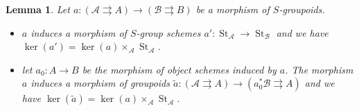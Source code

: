 \documentclass{amsart}
\newtheorem{lemm}{Lemma}[section]
\theoremstyle{definition}
\theoremstyle{remark}
\begin{document}
\begin{lemm}

\label{lemm}
Let $ a : ({{\mathcal A}} {\rightrightarrows} A) {\longrightarrow} ({{\mathcal B}} {\rightrightarrows} B)$ be a morphism of $S$-groupoids.
\begin{itemize}
\item[(i)] $a$ induces a morphism of $S$-group schemes $a' : \operatorname{St}_{{\mathcal A}} {\longrightarrow} \operatorname{St}_{{\mathcal B}}$ and we have $\ker(a') = \ker(a) \times_{{\mathcal A}} \operatorname{St}_{{\mathcal A}}$.

\item[(ii)] let $a_0 : A {\longrightarrow} B$ be the morphism of object schemes induced by $a$. The morphism $a$ induces a morphism of groupoids $\tilde{a} : ({{\mathcal A}} {\rightrightarrows} A) {\longrightarrow} (a_0^*{{\mathcal B}} {\rightrightarrows} A)$ and we have $\ker(\tilde{a}) = \ker(a) \times_{{\mathcal A}} \operatorname{St}_{{\mathcal A}}$.

\end{itemize}

\end{lemm}
\end{document}
